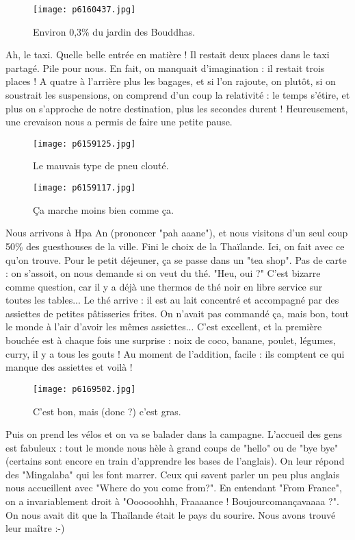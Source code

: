 \documentclass{book}
\begin{document}
\begin{figure}[h]
\centering
\texttt{[image: p6160437.jpg]}
\caption*{Environ 0,3\% du jardin des Bouddhas.}
\end{figure}

Ah, le taxi. Quelle belle entrée en matière ! Il restait deux places dans le taxi partagé. Pile pour nous. En fait, on manquait d'imagination : il restait trois places ! A quatre à l'arrière plus les bagages, et si l'on rajoute, on plutôt, si on soustrait les suspensions, on comprend d'un coup la relativité : le temps s'étire, et plus on s'approche de notre destination, plus les secondes durent ! Heureusement, une crevaison nous a permis de faire une petite pause.


\begin{figure}[h]
\centering
\texttt{[image: p6159125.jpg]}
\caption*{Le mauvais type de pneu clouté.}
\end{figure}


\begin{figure}[h]
\centering
\texttt{[image: p6159117.jpg]}
\caption*{Ça marche moins bien comme ça.}
\end{figure}

Nous arrivons à Hpa An (prononcer "pah aaane"), et nous visitons d'un seul coup 50\% des guesthouses de la ville. Fini le choix de la Thaïlande. Ici, on fait avec ce qu'on trouve. Pour le petit déjeuner, ça se passe dans un "tea shop". Pas de carte : on s’assoit, on nous demande si on veut du thé. "Heu, oui ?" C'est bizarre comme question, car il y a déjà une thermos de thé noir en libre service sur toutes les tables... Le thé arrive : il est au lait concentré et accompagné par des assiettes de petites pâtisseries frites. On n'avait pas commandé ça, mais bon, tout le monde à l'air d'avoir les mêmes assiettes... C'est excellent, et la première bouchée est à chaque fois une surprise : noix de coco, banane, poulet, légumes, curry, il y a tous les gouts ! Au moment de l'addition, facile : ils comptent ce qui manque des assiettes et voilà !


\begin{figure}[h]
\centering
\texttt{[image: p6169502.jpg]}
\caption*{C'est bon, mais (donc ?) c'est gras.}
\end{figure}

Puis on prend les vélos et on va se balader dans la campagne. L'accueil des gens est fabuleux : tout le monde nous hèle à grand coups de "hello" ou de "bye bye" (certains sont encore en train d'apprendre les bases de l'anglais). On leur répond des "Mingalaba" qui les font marrer. Ceux qui savent parler un peu plus anglais nous accueillent avec "Where do you come from?". En entendant "From France", on a invariablement droit à "Oooooohhh, Fraaaance ! Boujourcomançavaaaa ?". On nous avait dit que la Thaïlande était le pays du sourire. Nous avons trouvé leur maître :-)
\end{document}
